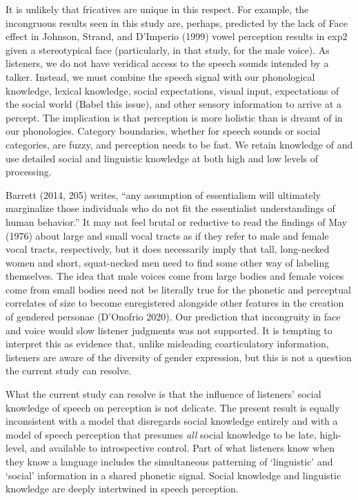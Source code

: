 \documentclass[
  letterpaper,
  DIV=11,
  numbers=noendperiod]{scrartcl}
\begin{document}
It is unlikely that fricatives are unique in this respect. For example,
the incongruous results seen in this study are, perhaps, predicted by
the lack of Face effect in Johnson, Strand, and D'Imperio (1999) vowel
perception results in exp2 given a stereotypical face (particularly, in
that study, for the male voice). As listeners, we do not have veridical
access to the speech sounds intended by a talker. Instead, we must
combine the speech signal with our phonological knowledge, lexical
knowledge, social expectations, visual input, expectations of the social
world (Babel this issue), and other sensory information to arrive at a
percept. The implication is that perception is more holistic than is
dreamt of in our phonologies. Category boundaries, whether for speech
sounds or social categories, are fuzzy, and perception needs to be fast.
We retain knowledge of and use detailed social and linguistic knowledge
at both high and low levels of processing.

Barrett (2014, 205) writes, ``any assumption of essentialism will
ultimately marginalize those individuals who do not fit the essentialist
understandings of human behavior.'' It may not feel brutal or reductive
to read the findings of May (1976) about large and small vocal tracts as
if they refer to male and female vocal tracts, respectively, but it does
necessarily imply that tall, long-necked women and short, squat-necked
men need to find some other way of labeling themselves. The idea that
male voices come from large bodies and female voices come from small
bodies need not be literally true for the phonetic and perceptual
correlates of size to become enregistered alongside other features in
the creation of gendered personae (D'Onofrio 2020). Our prediction that
incongruity in face and voice would slow listener judgments was not
supported. It is tempting to interpret this as evidence that, unlike
misleading coarticulatory information, listeners are aware of the
diversity of gender expression, but this is not a question the current
study can resolve.

What the current study can resolve is that the influence of listeners'
social knowledge of speech on perception is not delicate. The present
result is equally inconsistent with a model that disregards social
knowledge entirely and with a model of speech perception that presumes
\emph{all} social knowledge to be late, high-level, and available to
introspective control. Part of what listeners know when they know a
language includes the simultaneous patterning of `linguistic' and
`social' information in a shared phonetic signal. Social knowledge and
linguistic knowledge are deeply intertwined in speech perception.
\end{document}
